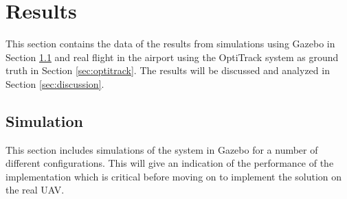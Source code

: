 \documentclass[../Head/report.tex]{subfiles}
\begin{document}
\section{Results}
\label{sec:results}

This section contains the data of the results from simulations using Gazebo in Section \ref{sec:simulation} and real flight in the airport using the OptiTrack system as ground truth in Section \ref{sec:optitrack}. The results will be discussed and analyzed in Section \ref{sec:discussion}.     

\subsection{Simulation}
\label{sec:simulation}

This section includes simulations of the system in Gazebo for a number of different configurations. This will give an indication of the performance of the implementation which is critical before moving on to implement the solution on the real UAV. 
\end{document}
